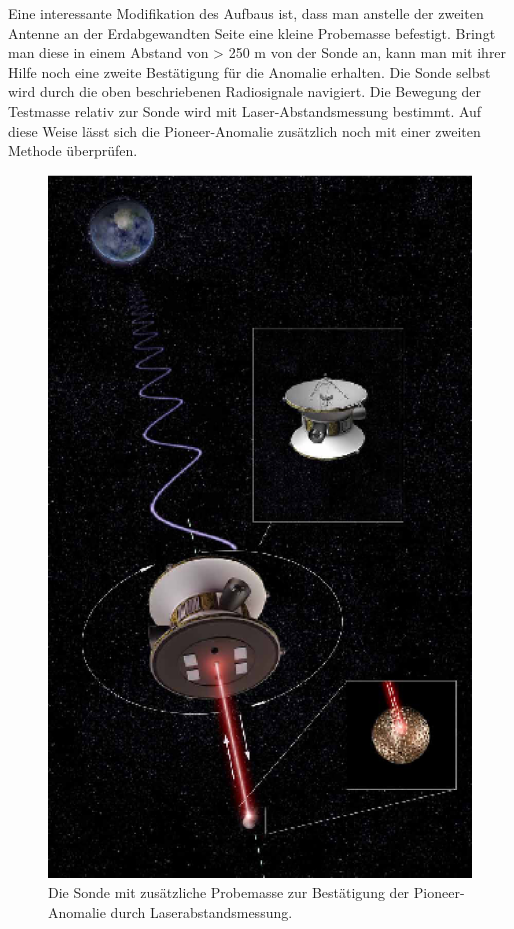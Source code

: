 Eine interessante Modifikation des Aufbaus ist, dass man anstelle der
zweiten Antenne an der Erdabgewandten Seite eine kleine Probemasse
befestigt. Bringt man diese in einem Abstand von {\textgreater} 250 m
von der Sonde an, kann man mit ihrer Hilfe noch eine zweite
Best\"a\-tigung f\"ur die Anomalie erhalten. Die Sonde selbst wird
durch die oben beschriebenen Ra\-diosignale navigiert. Die Bewegung der
Testmasse relativ zur Sonde wird mit Laser-Ab\-standsmessung bestimmt.
Auf diese Weise l\"asst sich die Pioneer-Anomalie zus\"atzlich noch mit
einer zweiten Methode \"uberpr\"ufen.

\begin{figure}[htbn]
\begin{center}
\noindent    
\includegraphics[angle=-90,width=\linewidth]{images/lasersonde}
\end{center}
\vskip -10pt
  \caption{Die Sonde mit zusätzliche Probemasse zur Bestätigung der Pioneer-Anomalie durch Laserabstandsmessung.\cite{alle2005}}
\label{fig:lasersonde}
\end{figure} 



